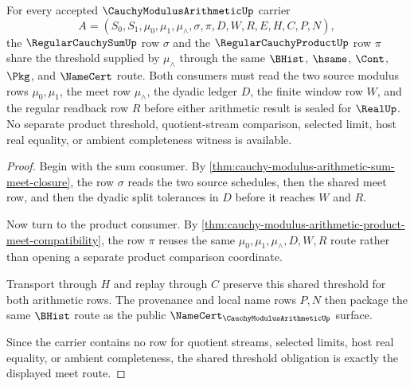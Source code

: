 \begin{theorem}
\label{thm:cauchy-modulus-arithmetic-sum-product-shared-threshold}
For every accepted $\CauchyModulusArithmeticUp$ carrier
$$
A=(S_0,S_1,\mu_0,\mu_1,\mu_{\wedge},\sigma,\pi,D,W,R,E,H,C,P,N),
$$
the $\RegularCauchySumUp$ row $\sigma$ and the
$\RegularCauchyProductUp$ row $\pi$ share the threshold supplied by
$\mu_{\wedge}$ through the same $\BHist$, $\hsame$, $\Cont$, $\Pkg$, and
$\NameCert$ route. Both consumers must read the two source modulus rows
$\mu_0,\mu_1$, the meet row $\mu_{\wedge}$, the dyadic ledger $D$, the finite
window row $W$, and the regular readback row $R$ before either arithmetic result
is sealed for $\RealUp$. No separate product threshold, quotient-stream
comparison, selected limit, host real equality, or ambient completeness witness
is available.
\end{theorem}
\begin{proof}
Begin with the sum consumer. By
\autoref{thm:cauchy-modulus-arithmetic-sum-meet-closure}, the row $\sigma$ reads
the two source schedules, then the shared meet row, and then the dyadic split
tolerances in $D$ before it reaches $W$ and $R$.

Now turn to the product consumer. By
\autoref{thm:cauchy-modulus-arithmetic-product-meet-compatibility}, the row
$\pi$ reuses the same $\mu_0,\mu_1,\mu_{\wedge},D,W,R$ route rather than opening
a separate product comparison coordinate.

Transport through $H$ and replay through $C$ preserve this shared threshold for
both arithmetic rows. The provenance and local name rows $P,N$ then package the
same $\BHist$ route as the public $\NameCert_{\CauchyModulusArithmeticUp}$
surface.

Since the carrier contains no row for quotient streams, selected limits, host
real equality, or ambient completeness, the shared threshold obligation is
exactly the displayed meet route.
\end{proof}

